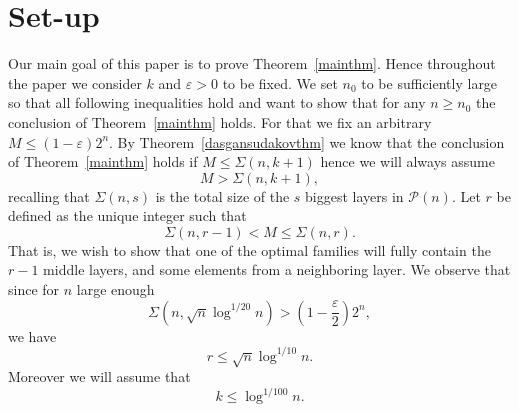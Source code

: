 \documentclass[12pt]{article}
\numberwithin{equation}{section}
\def\P{\mathcal{P}}
\def\eps{\varepsilon}
\begin{document}
\section{Set-up}\label{setupsection}

Our main goal of this paper is to prove Theorem~\ref{mainthm}. Hence throughout the paper we consider $k$ and $\eps>0$ to be fixed. We set $n_0$ to be sufficiently large so that all following inequalities hold and want to show that for any $n\geq n_0$ the conclusion of Theorem~\ref{mainthm} holds. For that we fix an arbitrary $M\leq (1-\eps)2^n$.  By Theorem~\ref{dasgansudakovthm} we know that the conclusion of Theorem~\ref{mainthm} holds if $M\leq \Sigma(n,k+1)$ hence we will always assume 
\begin{equation}\label{rkplus1}
M>\Sigma(n,k+1),
\end{equation} recalling that $\Sigma(n,s)$ is the total size of the $s$ biggest layers in $\P(n)$. Let $r$ be defined as the unique integer such that $$\Sigma(n,r-1)<M\leq \Sigma(n,r).$$
That is, we wish to show that one of the optimal families will fully contain the $r-1$ middle layers, and some elements from a neighboring layer. We observe that since for $n$ large enough $$\Sigma(n,\sqrt{n}\log^{1/20}n)>\left(1-\frac{\eps}{2}\right)2^n,$$ we have 
\begin{equation}\label{rupperbound}
r\leq \sqrt{n}\log^{1/10}n.
\end{equation}
Moreover we will assume that 
\begin{equation}\label{kupperbound}
k\leq \log^{1/100}n.
\end{equation}
\end{document}
